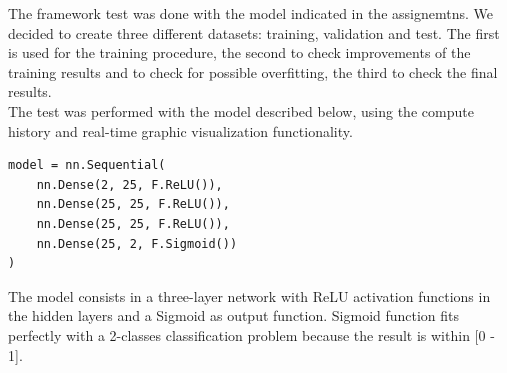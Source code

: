 The framework test was done with the model indicated in the assignemtns. We decided to create three different datasets: training, validation and test. The first is used for the training procedure, the second to check improvements of the training results and to check for possible overfitting, the third to check the final results. \\
The test was performed with the model described below, using the compute history and real-time graphic visualization functionality.

\begin{verbatim}
model = nn.Sequential(
	nn.Dense(2, 25, F.ReLU()),
	nn.Dense(25, 25, F.ReLU()),
	nn.Dense(25, 25, F.ReLU()),
	nn.Dense(25, 2, F.Sigmoid())
)  
\end{verbatim}
The model consists in a three-layer network with ReLU activation functions in the hidden layers and a Sigmoid as output function. Sigmoid function fits perfectly with a 2-classes classification problem because the result is within [0 - 1]. \\

